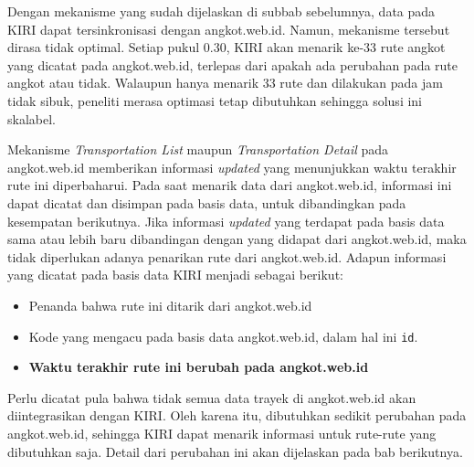 Dengan mekanisme yang sudah dijelaskan di subbab sebelumnya, data pada KIRI dapat tersinkronisasi dengan angkot.web.id. Namun, mekanisme tersebut dirasa tidak optimal. Setiap pukul 0.30, KIRI akan menarik ke-33 rute angkot yang dicatat pada angkot.web.id, terlepas dari apakah ada perubahan pada rute angkot atau tidak. Walaupun hanya menarik 33 rute dan dilakukan pada jam tidak sibuk, peneliti merasa optimasi tetap dibutuhkan sehingga solusi ini skalabel.

Mekanisme \textit{Transportation List} maupun \textit{Transportation Detail} pada angkot.web.id memberikan informasi \textit{updated} yang menunjukkan waktu terakhir rute ini diperbaharui. Pada saat menarik data dari angkot.web.id, informasi ini dapat dicatat dan disimpan pada basis data, untuk dibandingkan pada kesempatan berikutnya. Jika informasi \textit{updated} yang terdapat pada basis data sama atau lebih baru dibandingan dengan yang didapat dari angkot.web.id, maka tidak diperlukan adanya penarikan rute dari angkot.web.id. Adapun informasi yang dicatat pada basis data KIRI menjadi sebagai berikut:

\begin{itemize}
	\item Penanda bahwa rute ini ditarik dari angkot.web.id
	\item Kode yang mengacu pada basis data angkot.web.id, dalam hal ini \texttt{id}.
	\item \textbf{Waktu terakhir rute ini berubah pada angkot.web.id}
\end{itemize}

Perlu dicatat pula bahwa tidak semua data trayek di angkot.web.id akan diintegrasikan dengan KIRI. Oleh karena itu, dibutuhkan sedikit perubahan pada angkot.web.id, sehingga KIRI dapat menarik informasi untuk rute-rute yang dibutuhkan saja. Detail dari perubahan ini akan dijelaskan pada bab berikutnya.